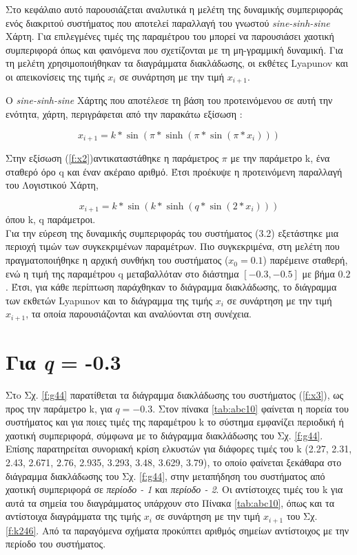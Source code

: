 Στο κεφάλαιο αυτό παρουσιάζεται αναλυτικά η μελέτη της δυναμικής συμπεριφοράς ενός διακριτού συστήματος που αποτελεί παραλλαγή του γνωστού \emph{sine-sinh-sine} Χάρτη. Για επιλεγμένες τιμές της παραμέτρου του μπορεί να παρουσιάσει χαοτική συμπεριφορά όπως και φαινόμενα που σχετίζονται με τη μη-γραμμική δυναμική. Για τη μελέτη χρησιμοποιήθηκαν τα διαγράμματα διακλάδωσης, οι εκθέτες Lyapunov και οι απεικονίσεις της τιμής \(x_i\) σε συνάρτηση με  την τιμή \(x_{i+1}\).

Ο \emph{sine-sinh-sine} Χάρτης που αποτέλεσε τη βάση του προτεινόμενου σε αυτή την ενότητα, χάρτη, περιγράφεται από την παρακάτω εξίσωση \cite{b10}:

\begin{equation}
	x_{i+1}=k*\sin(\pi*\sinh(\pi*\sin(\pi* x_i)))
	\label{f:x2}
\end{equation}


Στην εξίσωση (\ref{f:x2})αντικαταστάθηκε η παράμετρος $\pi$
με την παράμετρο k, ένα σταθερό όρο q και έναν ακέραιο αριθμό. Έτσι προέκυψε η προτεινόμενη παραλλαγή του Λογιστικού Χάρτη,

\begin{equation}
	x_{i+1}=k*\sin(k*\sinh(q*\sin(2 * x_i)))
	\label{f:x3}
\end{equation}
όπου k, q παράμετροι.\\

Για την εύρεση της δυναμικής συμπεριφοράς του συστήματος (3.2) εξετάστηκε μια περιοχή τιμών των συγκεκριμένων παραμέτρων. Πιο συγκεκριμένα, στη μελέτη που πραγματοποιήθηκε η αρχική συνθήκη του συστήματος ($x_0 =0.1$) παρέμεινε  σταθερή, ενώ η τιμή της παραμέτρου q μεταβαλλόταν στο διάστημα $[-0.3,-0.5]$ με βήμα $0.2$. Έτσι, για κάθε περίπτωση παράχθηκαν το διάγραμμα διακλάδωσης, το διάγραμμα των εκθετών Lyapunov και το διάγραμμα της τιμής \(x_i\) σε συνάρτηση με  την τιμή \(x_{i+1}\), τα οποία παρουσιάζονται και αναλύονται στη συνέχεια.\\


\vspace{\fill}

\section{Για \emph{q} = -0.3}


Στo Σχ. \ref{f:g44} παρατίθεται τα διάγραμμα διακλάδωσης του συστήματος (\ref{f:x3}), ως προς την παράμετρο k, για $q =- 0.3$. 
Στον πίνακα \ref{tab:abc10} φαίνεται η πορεία του συστήματος και για ποιες τιμές της παραμέτρου k το σύστημα εμφανίζει περιοδική ή χαοτική συμπεριφορά, σύμφωνα με το διάγραμμα διακλάδωσης του Σχ. \ref{f:g44}. Επίσης παρατηρείται συνοριακή κρίση ελκυστών για διάφορες τιμές του k (2.27, 2.31, 2.43, 2.671, 2.76, 2.935, 3.293, 3.48, 3.629, 3.79), το οποίο φαίνεται ξεκάθαρα στο διάγραμμα διακλάδωσης του Σχ. \ref{f:g44}, στην μεταπήδηση του συστήματος από χαοτική συμπεριφορά σε \emph{περίοδο - 1} και \emph{περίοδο - 2}. Οι αντίστοιχες τιμές του k για αυτά τα σημεία του διαγράμματος υπάρχουν στο Πίνακα \ref{tab:abc10}, όπως και τα αντίστοιχα διαγράμματα της τιμής \(x_i\) σε συνάρτηση με την τιμή \(x_{i+1}\) του Σχ. \ref{f:k246}. Από τα παραγόμενα σχήματα προκύπτει αριθμός σημείων αντίστοιχος με την περίοδο του συστήματος.

